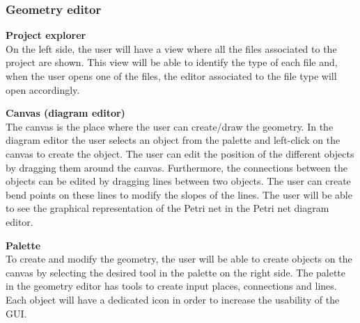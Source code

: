 \subsubsection{Geometry editor}
\textbf{Project explorer} \\
On the left side, the user will have a view where all the files associated to the project are shown. This view will be able to identify the type of each file and, when the user opens one of the files, the editor associated to the file type will open accordingly. 

\textbf{Canvas (diagram editor)} \\
The canvas is the place where the user can create/draw the geometry. In the diagram editor the user selects an object from the palette and left-click on the canvas to create the object. The user can edit the position of the different objects by dragging them around the canvas. Furthermore, the connections between the objects can be edited by dragging lines between two objects. The user can create bend points on these lines to modify the slopes of the lines. The user will be able to see the graphical representation of the Petri net in the Petri net diagram editor. 

\textbf{Palette} \\
To create and modify the geometry, the user will be able to create objects on the canvas by selecting the desired tool in the palette on the right side. The palette in the geometry editor has tools to create input places, connections and lines. Each object will have a dedicated icon in order to increase the usability of the GUI.

